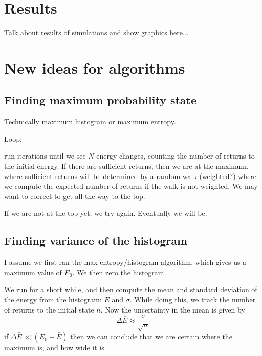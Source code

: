 \documentclass[letterpaper,twocolumn,amsmath,amssymb,pre,aps,10pt]{revtex4-1}
\begin{document}
\section{Results}

Talk about results of simulations and show graphics here...


\section{New ideas for algorithms}

\subsection{Finding maximum probability state}

Technically maximum histogram or maximum entropy.

Loop:

run iterations until we see $N$ energy changes, counting the number of
returns to the initial energy.  If there are sufficient returns, then
we are at the maximum, where sufficient returns will be determined by
a random walk (weighted?) where we compute the expected number of
returns if the walk is not weighted.  We may want to correct to get
all the way to the top.

If we are not at the top yet, we try again.  Eventually we will be.

\subsection{Finding variance of the histogram}

I assume we first ran the max-entropy/histogram algorithm, which gives
us a maximum value of $E_0$.  We then zero the histogram.

We run for a short while, and then compute the mean and standard
deviation of the energy from the histogram: $\bar E$ and $\sigma$.
While doing this, we track the number of returns to the initial state
$n$.  Now the uncertainty in the mean is given by
\begin{equation}
  \Delta \bar E \approx \frac{\sigma}{\sqrt{n}}
\end{equation}
if $\Delta \bar E \ll (E_0 - \bar E)$ then we can conclude that we are
certain where the maximum is, and how wide it is.

\end{document}

